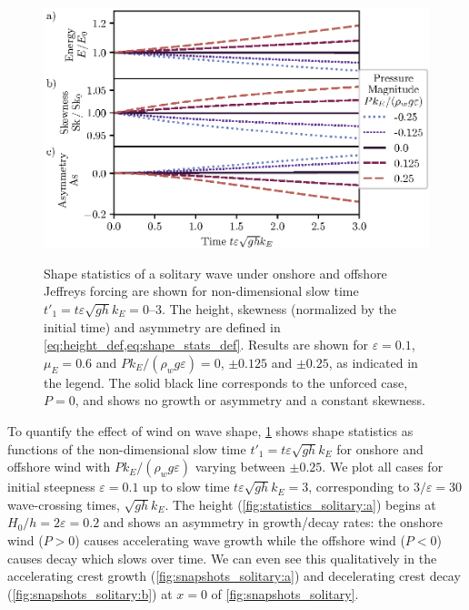 \documentclass{jfm}
\renewcommand*{\epsilon}{\varepsilon}
\begin{document}
\begin{figure}
  \centering
  { %
    \label{fig:statistics_solitary:a}
    \label{fig:statistics_solitary:b}
    \label{fig:statistics_solitary:c}
  }
  \includegraphics{Skew-Asymm-Production.eps}
  \caption{
    Shape statistics of a solitary wave under onshore and offshore
    Jeffreys forcing are shown for non-dimensional slow time $t'_1 = t
    \epsilon \sqrt{gh} k_E = \numrange{0}{3}$.
    The
    height,
    skewness (normalized by the initial time) and
    asymmetry are defined in
    \cref{eq:height_def,eq:shape_stats_def}.
    Results are shown for $\epsilon=0.1$, $\mu_E = 0.6$ and $P
    k_E/(\rho_w g \epsilon) = 0$, $\pm 0.125$ and $\pm 0.25$, as
    indicated in the legend.
    The solid black line corresponds to the unforced case, $P = 0$, and
    shows no growth or asymmetry and a constant skewness.
  }\label{fig:statistics_solitary}
\end{figure}

To quantify the effect of wind on wave shape,
\cref{fig:statistics_solitary} shows shape statistics as functions of
the non-dimensional slow time $t'_1 = t \epsilon \sqrt{g h} k_E$ for
onshore and offshore wind with $P k_E/(\rho_w g \epsilon)$ varying
between $\pm 0.25$.
We plot all cases for initial steepness $\epsilon = 0.1$ up to slow time
$t \epsilon \sqrt{g h} k_E = 3$, corresponding to $3/\epsilon = 30$
wave-crossing times, $\sqrt{gh} k_E$.
The height (\cref{fig:statistics_solitary:a}) begins at $H_0/h = 2
\epsilon = 0.2$ and shows an asymmetry in growth/decay rates: the
onshore wind ($P>0$) causes accelerating wave growth while the offshore
wind ($P<0$) causes decay which slows over time.
We can even see this qualitatively in the accelerating crest growth
(\cref{fig:snapshots_solitary:a}) and decelerating crest decay
(\cref{fig:snapshots_solitary:b}) at $x=0$ of
\cref{fig:snapshots_solitary}.
\end{document}
